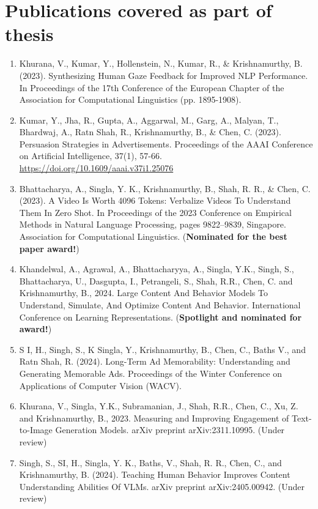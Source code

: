 \chapter*{Publications covered as part of thesis}
\begin{enumerate}
    \item Khurana, V., Kumar, Y., Hollenstein, N., Kumar, R., \& Krishnamurthy, B. (2023). Synthesizing Human Gaze Feedback for Improved NLP Performance. In Proceedings of the 17th Conference of the European Chapter of the Association for Computational Linguistics (pp. 1895-1908).
    
    \item Kumar, Y., Jha, R., Gupta, A., Aggarwal, M., Garg, A., Malyan, T., Bhardwaj, A., Ratn Shah, R., Krishnamurthy, B., \& Chen, C. (2023). Persuasion Strategies in Advertisements. Proceedings of the AAAI Conference on Artificial Intelligence, 37(1), 57-66. \url{https://doi.org/10.1609/aaai.v37i1.25076}

    \item Bhattacharya, A., Singla, Y. K., Krishnamurthy, B., Shah, R. R., \& Chen, C. (2023). A Video Is Worth 4096 Tokens: Verbalize Videos To Understand Them In Zero Shot. In Proceedings of the 2023 Conference on Empirical Methods in Natural Language Processing, pages 9822–9839, Singapore. Association for Computational Linguistics. (\textbf{Nominated for the best paper award!})

    \item Khandelwal, A., Agrawal, A., Bhattacharyya, A., Singla, Y.K., Singh, S., Bhattacharya, U., Dasgupta, I., Petrangeli, S., Shah, R.R., Chen, C. and Krishnamurthy, B., 2024. Large Content And Behavior Models To Understand, Simulate, And Optimize Content And Behavior. International Conference on Learning Representations. (\textbf{Spotlight and nominated for award!})

    \item  S I, H., Singh, S., K Singla, Y., Krishnamurthy, B., Chen, C., Baths V., and Ratn Shah, R. (2024). Long-Term Ad Memorability: Understanding and Generating Memorable Ads. Proceedings of the Winter Conference on Applications of Computer Vision (WACV).

    \item Khurana, V., Singla, Y.K., Subramanian, J., Shah, R.R., Chen, C., Xu, Z. and Krishnamurthy, B., 2023. Measuring and Improving Engagement of Text-to-Image Generation Models. arXiv preprint arXiv:2311.10995. (Under review)

    \item Singh, S., SI, H., Singla, Y. K., Baths, V., Shah, R. R., Chen, C., and Krishnamurthy, B. (2024). Teaching Human Behavior Improves Content Understanding Abilities Of VLMs. arXiv preprint arXiv:2405.00942. (Under review)

\end{enumerate}



